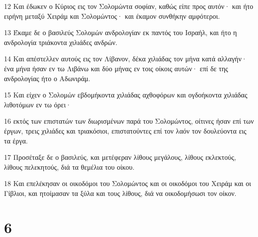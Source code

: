 \par 12 Και έδωκεν ο Κύριος εις τον Σολομώντα σοφίαν, καθώς είπε προς αυτόν· και ήτο ειρήνη μεταξύ Χειράμ και Σολομώντος· και έκαμον συνθήκην αμφότεροι.
\par 13 Έκαμε δε ο βασιλεύς Σολομών ανδρολογίαν εκ παντός του Ισραήλ, και ήτο η ανδρολογία τριάκοντα χιλιάδες ανδρών.
\par 14 Και απέστελλεν αυτούς εις τον Λίβανον, δέκα χιλιάδας τον μήνα κατά αλλαγήν· ένα μήνα ήσαν εν τω Λιβάνω και δύο μήνας εν τοις οίκοις αυτών· επί δε της ανδρολογίας ήτο ο Αδωνιράμ.
\par 15 Και είχεν ο Σολομών εβδομήκοντα χιλιάδας αχθοφόρων και ογδοήκοντα χιλιάδας λιθοτόμων εν τω όρει·
\par 16 εκτός των επιστατών των διωρισμένων παρά του Σολομώντος, οίτινες ήσαν επί των έργων, τρεις χιλιάδες και τριακόσιοι, επιστατούντες επί τον λαόν τον δουλεύοντα εις τα έργα.
\par 17 Προσέταξε δε ο βασιλεύς, και μετέφεραν λίθους μεγάλους, λίθους εκλεκτούς, λίθους πελεκητούς, διά τα θεμέλια του οίκου.
\par 18 Και επελέκησαν οι οικοδόμοι του Σολομώντος και οι οικοδόμοι του Χειράμ και οι Γίβλιοι, και ητοίμασαν τα ξύλα και τους λίθους, διά να οικοδομήσωσι τον οίκον.

\chapter{6}

